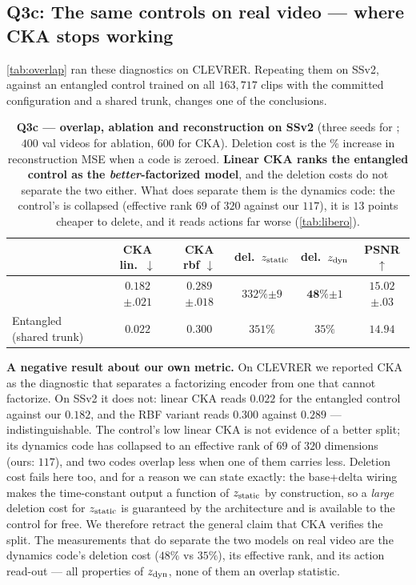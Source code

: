 \subsection{Q3c: The same controls on real video --- where CKA stops working}
\label{sec:ssv2diag}
\cref{tab:overlap} ran these diagnostics on CLEVRER. Repeating them on SSv2, against an
entangled control trained on all $163{,}717$ clips with the committed configuration and a
shared trunk, changes one of the conclusions.

\begin{table}[t]
\centering\small
\caption{\textbf{Q3c --- overlap, ablation and reconstruction on SSv2} (three seeds for
\method{}; $400$ val videos for ablation, $600$ for CKA). Deletion cost is the \%
increase in reconstruction MSE when a code is zeroed. \textbf{Linear CKA ranks the
entangled control as the \emph{better}-factorized model}, and the deletion costs do not
separate the two either. What does separate them is the dynamics code: the control's is
collapsed (effective rank $69$ of $320$ against our $117$), it is $13$ points cheaper to
delete, and it reads actions far worse (\cref{tab:libero}).}
\label{tab:ssv2diag}
\begin{tabular}{lccccc}
\toprule
& CKA lin.\ $\downarrow$ & CKA rbf $\downarrow$ & del.\ $z_{\mathrm{static}}$ & del.\ $z_{\mathrm{dyn}}$ & PSNR $\uparrow$ \\
\midrule
\textbf{\method{}} & $0.182${\tiny$\pm.021$} & $\mathbf{0.289}${\tiny$\pm.018$}
  & $332\%${\tiny$\pm9$} & $\mathbf{48\%}${\tiny$\pm1$} & $\mathbf{15.02}${\tiny$\pm.03$} \\
Entangled (shared trunk) & $\mathbf{0.022}$ & $0.300$ & $351\%$ & $35\%$ & $14.94$ \\
\bottomrule
\end{tabular}
\end{table}

\textbf{A negative result about our own metric.} On CLEVRER we reported CKA as the
diagnostic that separates a factorizing encoder from one that cannot factorize. On SSv2
it does not: linear CKA reads $0.022$ for the entangled control against our $0.182$, and
the RBF variant reads $0.300$ against $0.289$ --- indistinguishable. The control's low
linear CKA is not evidence of a better split; its dynamics code has collapsed to an
effective rank of $69$ of $320$ dimensions (ours: $117$), and two codes overlap less when
one of them carries less. Deletion cost fails here too, and for a reason we can state
exactly: the base+delta wiring makes the time-constant output a function of $z_{\mathrm{static}}$ by
construction, so a \emph{large} deletion cost for $z_{\mathrm{static}}$ is guaranteed by the architecture and is
available to the control for free. We therefore retract the general claim that CKA
verifies the split. The measurements that do separate the two models on real video are
the dynamics code's deletion cost ($48\%$ vs $35\%$), its effective rank, and its
action read-out --- all properties of $z_{\mathrm{dyn}}$, none of them an overlap statistic.

